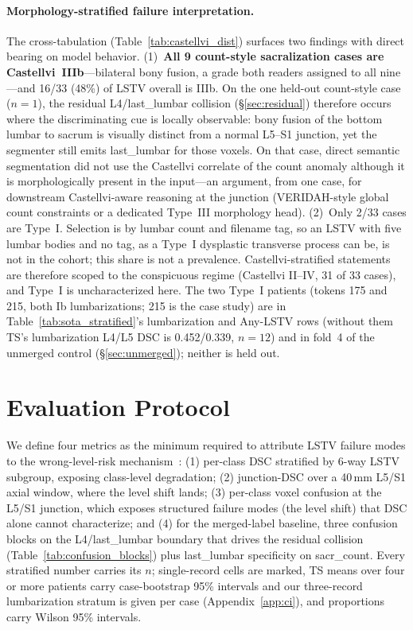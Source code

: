 \documentclass{article}
\newcommand{\sota}{TS}
\newcommand{\VERIDAH}{VERIDAH}
\begin{document}
\paragraph{Morphology-stratified failure interpretation.}
The cross-tabulation (Table~\ref{tab:castellvi_dist})
surfaces two findings with direct bearing on model
behavior. (1)~\textbf{All 9 count-style sacralization
cases are Castellvi~IIIb}---bilateral bony fusion, a grade
both readers assigned to all nine---and 16/33 (48\%) of
LSTV overall is IIIb. On the one held-out count-style
case ($n{=}1$), the residual L4/last\_lumbar collision
(\S\ref{sec:residual}) therefore occurs where the
discriminating cue is locally observable: bony
fusion of the bottom lumbar to sacrum is visually distinct
from a normal L5--S1 junction, yet the segmenter still
emits last\_lumbar for those voxels. On that case, direct
semantic segmentation did not use the Castellvi correlate
of the count anomaly although it is morphologically
present in the input---an argument, from one case, for
downstream Castellvi-aware reasoning at the junction
(\VERIDAH{}-style global count constraints or a
dedicated Type~III morphology head). (2)~Only 2/33 cases
are Type~I. Selection is by lumbar count and filename
tag, so an LSTV with five lumbar bodies and no tag, as a
Type~I dysplastic transverse process can be, is not in
the cohort; this share is not a prevalence.
Castellvi-stratified statements are therefore scoped to
the conspicuous regime (Castellvi II--IV, 31 of 33
cases), and Type~I is uncharacterized here. The two
Type~I patients (tokens 175 and 215, both Ib
lumbarizations; 215 is the case study) are in
Table~\ref{tab:sota_stratified}'s lumbarization and
Any-LSTV rows (without them \sota{}'s lumbarization
L4/L5 DSC is 0.452/0.339, $n{=}12$) and in fold~4 of the
unmerged control (\S\ref{sec:unmerged}); neither is held
out.

\section{Evaluation Protocol}
\label{sec:protocol}

We define four metrics as the minimum required to attribute
LSTV failure modes to the wrong-level-risk
mechanism~\citep{Maier-Hein2024MetricsValidation}: (1) per-class
DSC stratified by 6-way LSTV subgroup, exposing class-level
degradation; (2) junction-DSC over a 40\,mm L5/S1 axial
window, where the level shift lands;
(3) per-class voxel confusion at the L5/S1 junction, which
exposes structured failure modes (the level shift) that
DSC alone cannot characterize; and (4) for the merged-label
baseline, three confusion blocks on the L4/last\_lumbar
boundary that drives the residual collision
(Table~\ref{tab:confusion_blocks}) plus last\_lumbar
specificity on sacr\_count.
Every stratified number carries its $n$; single-record
cells are marked, \sota{} means over four or more
patients carry case-bootstrap 95\% intervals and our
three-record lumbarization stratum is given per case
(Appendix~\ref{app:ci}), and proportions carry Wilson
95\% intervals.
\end{document}
